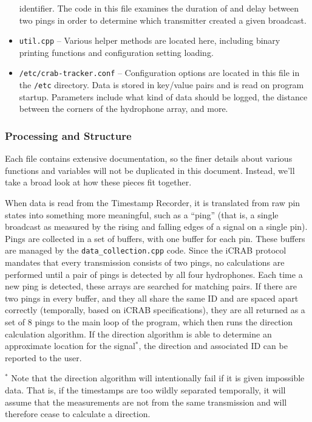 \documentclass[12pt]{article}
\begin{document}
\begin{itemize}
	identifier. The code in this file examines the duration of and delay
	between two pings in order to determine which transmitter created a
	given broadcast.
\item \texttt{util.cpp} --
	Various helper methods are located here, including binary printing
	functions and configuration setting loading.
\item \texttt{/etc/crab-tracker.conf} --
	Configuration options are located in this file in the \texttt{/etc}
	directory. Data is stored in key/value pairs and is read on program
	startup. Parameters include what kind of data should be logged, the
	distance between the corners of the hydrophone array, and more.
\end{itemize}

\subsubsection{Processing and Structure}\label{sec:proc-and-structure}


Each file contains extensive documentation, so the finer details about
various functions and variables will not be
duplicated in this document. Instead, we'll take a broad look at how these
pieces fit together.

When data is read from the Timestamp Recorder, it is translated from raw pin
states into something more meaningful, such as a ``ping'' (that is, a single
broadcast as measured by the rising and falling edges of a signal on a single
pin).
Pings are collected in a set of buffers, with one buffer for each pin.
These buffers are managed by the \texttt{data\_collection.cpp} code.
Since the \gls{iCRAB} protocol mandates that every transmission consists
of two pings, no calculations are performed until a pair of pings is detected
by all four hydrophones.
Each time a new ping is detected, these arrays are searched for matching pairs.
If there are two pings in every buffer, and they all share the same ID
and are spaced apart correctly (temporally, based on \gls{iCRAB}
specifications), they are all returned as a set of 8 pings to the main loop of
the program, which then runs the direction calculation algorithm.
If the direction algorithm is able to determine an approximate location for
the signal$^*$, the direction and associated ID can be reported to the user.

$^*$ Note that the direction algorithm will intentionally fail if it is given
impossible data.
That is, if the timestamps are too wildly separated temporally, it will assume
that the measurements are not from the same transmission and will therefore
cease to calculate a direction.

\newpage

\printglossary
\end{document}
